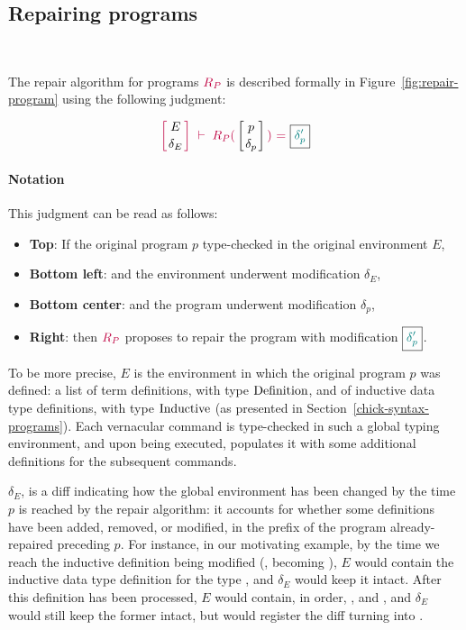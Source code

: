 \subsection{Repairing programs}~\label{repair-program}

The repair algorithm for programs $\textcolor{purple}{R_{P}}$ is described formally in
Figure~\ref{fig:repair-program} using the following judgment:

{
  \[
    {\turnstile
      {\denv{E}{\delta_E}}
      {\repairProg{p}{\delta_p}{\delta_p'}}
    }
  \]
}

\paragraph{Notation} This judgment can be read as follows:
\begin{itemize}
\item \textbf{Top}: If the original program $p$ type-checked in the original environment $E$,
\item \textbf{Bottom left}: and the environment underwent modification $\delta_{E}$,
\item \textbf{Bottom center}: and the program underwent modification $\delta_{p}$,
\item \textbf{Right}: then $\textcolor{purple}{R_{P}}$ proposes to repair the program with modification $\boxed{ \textcolor{teal}{\delta'_{p}} }$.
\end{itemize}

To be more precise, $E$ is the environment in which the original program $p$ was
defined: a list of term definitions, with type $\text{Definition}$, and of
inductive data type definitions, with type $\text{Inductive}$ (as presented
in Section~\ref{chick-syntax-programs}).  Each vernacular command is
type-checked in such a global typing environment, and upon being executed,
populates it with some additional definitions for the subsequent commands.

$\delta_E$, is a diff indicating how the global environment has been changed by
the time $p$ is reached by the repair algorithm: it accounts for whether some
definitions have been added, removed, or modified, in the prefix of the program
already-repaired preceding $p$.  For instance, in our motivating example, by the
time we reach the inductive definition being modified (,
becoming ), $E$ would contain the inductive data type definition
for the type , and $\delta_E$ would keep it intact.  After this
definition has been processed, $E$ would contain, in order, , and
, and $\delta_E$ would still keep the former intact, but would
register the diff turning  into .

